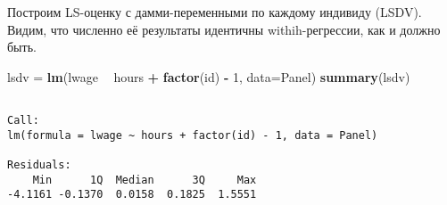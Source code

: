 \documentclass[]{article}
\newenvironment{Shaded}{\begin{snugshade}}{\end{snugshade}}
\newcommand{\DataTypeTok}[1]{\textcolor[rgb]{0.13,0.29,0.53}{#1}}
\newcommand{\DecValTok}[1]{\textcolor[rgb]{0.00,0.00,0.81}{#1}}
\newcommand{\KeywordTok}[1]{\textcolor[rgb]{0.13,0.29,0.53}{\textbf{#1}}}
\newcommand{\NormalTok}[1]{#1}
\newcommand{\OperatorTok}[1]{\textcolor[rgb]{0.81,0.36,0.00}{\textbf{#1}}}
\newcommand{\StringTok}[1]{\textcolor[rgb]{0.31,0.60,0.02}{#1}}
\begin{document}
Построим LS-оценку с дамми-переменными по каждому индивиду (LSDV).
Видим, что численно её результаты идентичны withih-регрессии, как и
должно быть.

\begin{Shaded}
\begin{Highlighting}[]
\NormalTok{lsdv =}\StringTok{ }\KeywordTok{lm}\NormalTok{(lwage }\OperatorTok{~}\StringTok{ }\NormalTok{hours }\OperatorTok{+}\StringTok{ }\KeywordTok{factor}\NormalTok{(id) }\OperatorTok{-}\StringTok{ }\DecValTok{1}\NormalTok{, }\DataTypeTok{data=}\NormalTok{Panel)}
\KeywordTok{summary}\NormalTok{(lsdv)}
\end{Highlighting}
\end{Shaded}

\begin{verbatim}

Call:
lm(formula = lwage ~ hours + factor(id) - 1, data = Panel)

Residuals:
    Min      1Q  Median      3Q     Max 
-4.1161 -0.1370  0.0158  0.1825  1.5551 


\end{verbatim}
\end{document}
